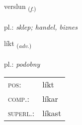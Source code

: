 \documentclass[frontgrid, backgrid]{flacards}\usepackage[]{graphicx}\usepackage[]{xcolor}
\begin{document}
\renewcommand{\flhead}{\vskip5pt \fboxsep=0pt {\small\bfseries\footnotesize Nafnorð | rzeczownik}}
\renewcommand{\fcfoot}{\vskip5pt \fboxsep=0pt \hspace{2pt}{\small\bfseries\footnotesize 1K}}

\renewcommand{\blhead}{\vskip5pt {\small\bfseries\footnotesize Nafnorð | rzeczownik }}
\renewcommand{\bcfoot}{\vskip5pt \hspace{2pt}{\small\bfseries\footnotesize 1K}}


{verslun \small{\textsubscript{(\textit{f.})}} \\[1ex] %
 \\
pl.: \emph{sklep; handel, biznes} \\  [2ex]
\renewcommand*{\arraystretch}{0.8}
}

\renewcommand{\flhead}{\vskip5pt \fboxsep=0pt {\small\bfseries\footnotesize Atviksorð | przysłówek}}
\renewcommand{\fcfoot}{\vskip5pt \fboxsep=0pt \hspace{2pt}{\small\bfseries\footnotesize 1K}}

\renewcommand{\blhead}{\vskip5pt {\small\bfseries\footnotesize Atviksorð | przysłówek }}
\renewcommand{\bcfoot}{\vskip5pt \hspace{2pt}{\small\bfseries\footnotesize 1K}}


{líkt \small{\textsubscript{(\textit{adv.})}} \\[1ex] %
\textphonetic{[lixt]} \\
pl.: \emph{podobny} \\  [2ex]
\renewcommand*{\arraystretch}{0.8}
\begin{tabular}{ll}
\textsc{pos}: & líkt \\ 
\textsc{comp.}: & líkar \\ 
\textsc{superl.}: & líkast \\
\end{tabular}
}
\end{document}
